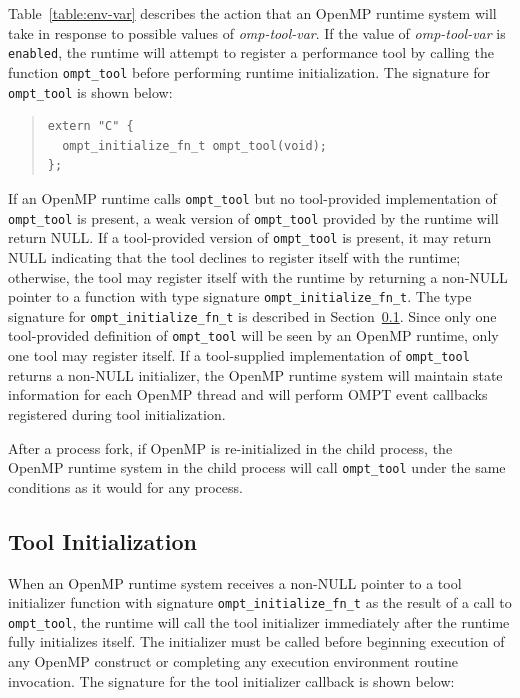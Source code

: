 \documentclass{article}
\begin{document}
\sloppy
Table~\ref{table:env-var} describes the action that an OpenMP runtime system will take in response to possible values of {\em omp-tool-var}.
If the value of {\em omp-tool-var}  is  \verb|enabled|, the runtime will attempt to register  a performance tool by calling the function \verb|ompt_tool| before performing  runtime initialization. The signature for  \verb|ompt_tool|  is shown below:
\begin{quote}
\begin{verbatim}
extern "C" {
  ompt_initialize_fn_t ompt_tool(void);
};
\end{verbatim}
\end{quote}
If an OpenMP runtime calls \verb|ompt_tool| but no tool-provided implementation of \verb|ompt_tool| is present,
a weak version of \verb|ompt_tool| provided by the runtime  will return NULL. If a tool-provided version of \verb|ompt_tool| is present, it may return NULL indicating that the tool declines to register itself with the runtime; otherwise, the tool  may register itself with the runtime by returning a non-NULL pointer to a function with type signature \verb|ompt_initialize_fn_t|. The type signature for \verb|ompt_initialize_fn_t| is described in Section~\ref{sec:init}. 
Since only one tool-provided definition of \verb|ompt_tool| will be seen by an OpenMP runtime, only one tool may register itself. 
If a tool-supplied implementation of \verb|ompt_tool| returns a non-NULL initializer, the OpenMP runtime system will maintain state information for each OpenMP thread and will perform OMPT event callbacks registered during tool initialization. 

After a process fork, if OpenMP is re-initialized in the child process,
the OpenMP runtime system in the child process will call  \verb|ompt_tool| under the same conditions as it would for any process. 

\subsection{Tool Initialization}
\label{sec:init}

When an OpenMP runtime system receives a non-NULL pointer to a tool initializer function with signature \verb|ompt_initialize_fn_t| as the result of a call to  \verb|ompt_tool|, the runtime will call the tool initializer immediately after the runtime fully initializes itself. The initializer must be called before beginning execution of any OpenMP construct or completing any execution environment  routine invocation.  The signature for the tool initializer callback is shown below:
\end{document}
